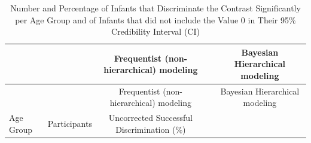 \documentclass[openright,titlepage,12pt,a4paper]{book}
\begin{document}
\begin{longtable}[]{@{}llclc@{}}
\caption{\label{tab:ch04tab3} Number and Percentage of Infants that Discriminate the Contrast Significantly per Age Group and of Infants that did not include the Value 0 in Their 95\% Credibility Interval (CI)}\tabularnewline
\toprule
\begin{minipage}[b]{0.09\columnwidth}\raggedright
\strut
\end{minipage} & \begin{minipage}[b]{0.15\columnwidth}\raggedright
\strut
\end{minipage} & \begin{minipage}[b]{0.16\columnwidth}\centering
Frequentist
(non-hierarchical)
modeling\strut
\end{minipage} & \begin{minipage}[b]{0.16\columnwidth}\raggedright
\strut
\end{minipage} & \begin{minipage}[b]{0.28\columnwidth}\centering
Bayesian Hierarchical modeling\strut
\end{minipage}\tabularnewline
\midrule
\endfirsthead
\toprule
\begin{minipage}[b]{0.09\columnwidth}\raggedright
\strut
\end{minipage} & \begin{minipage}[b]{0.15\columnwidth}\raggedright
\strut
\end{minipage} & \begin{minipage}[b]{0.16\columnwidth}\centering
Frequentist
(non-hierarchical)
modeling\strut
\end{minipage} & \begin{minipage}[b]{0.16\columnwidth}\raggedright
\strut
\end{minipage} & \begin{minipage}[b]{0.28\columnwidth}\centering
Bayesian Hierarchical modeling\strut
\end{minipage}\tabularnewline
\midrule
\endhead
\begin{minipage}[t]{0.09\columnwidth}\raggedright
Age Group\strut
\end{minipage} & \begin{minipage}[t]{0.15\columnwidth}\raggedright
Participants\strut
\end{minipage} & \begin{minipage}[t]{0.16\columnwidth}\centering
Uncorrected
Successful
Discrimination (\%)\strut
\end{minipage} & \begin{minipage}[t]{0.16\columnwidth}\raggedright

\end{minipage}
\end{longtable}
\end{document}
